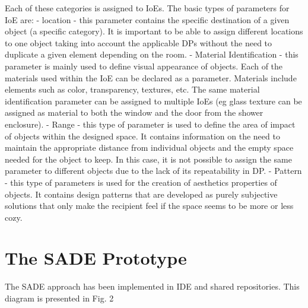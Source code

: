 \documentclass[runningheads]{llncs}
\begin{document}
Each of these categories is assigned to IoEs. The basic types of parameters for IoE are:
- location - this parameter contains the specific destination of a given object (a specific category). It is important to be able to assign different locations to one object taking into account the applicable DPs without the need to duplicate a given element depending on the room.
- Material Identification - this parameter is mainly used to define visual appearance of objects. Each of the materials used within the IoE can be declared as a parameter. Materials include elements such as color, transparency, textures, etc. The same material identification parameter can be assigned to multiple IoEs (eg glass texture can be assigned as material to both the window and the door from the shower enclosure).
- Range - this type of parameter is used to define the area of impact of objects within the designed space. It contains information on the need to maintain the appropriate distance from individual objects and the empty space needed for the object to keep. In this case, it is not possible to assign the same parameter to different objects due to the lack of its repeatability in DP.
- Pattern - this type of parameters is used for the creation of aesthetics properties of objects. It contains design patterns that are developed as purely subjective solutions that only make the recipient feel if the space seems to be more or less cozy. 


\section{The SADE Prototype}
The SADE approach has been implemented in IDE and shared repositories. This diagram is presented in Fig. 2
\end{document}
